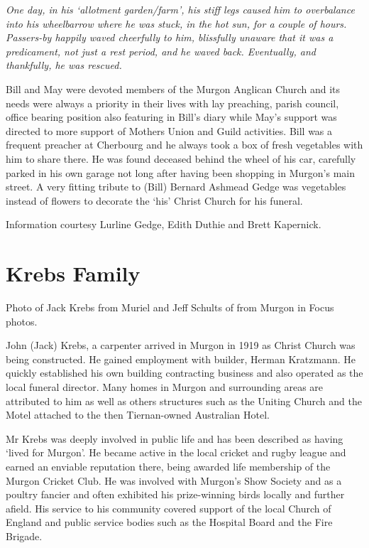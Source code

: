 \emph{One day, in his `allotment garden/farm', his stiff legs caused him to overbalance into his wheelbarrow where he was stuck, in the hot sun, for a couple of hours. Passers-by happily waved cheerfully to him, blissfully unaware that it was a predicament, not just a rest period, and he waved back. Eventually, and thankfully, he was rescued.}

Bill and May were devoted members of the Murgon Anglican Church and its needs were always a priority in their lives with lay preaching, parish council, office bearing position also featuring in Bill's diary while May's support was directed to more support of Mothers Union and Guild activities. Bill was a frequent preacher at Cherbourg and he always took a box of fresh vegetables with him to share there. He was found deceased behind the wheel of his car, carefully parked in his own garage not long after having been shopping in Murgon's main street. A very fitting tribute to (Bill) Bernard Ashmead Gedge was vegetables instead of flowers to decorate the `his' Christ Church for his funeral.

Information courtesy Lurline Gedge, Edith Duthie and Brett Kapernick.

\hypertarget{krebs-family}{%
\section{Krebs Family}\label{krebs-family}}

Photo of Jack Krebs from Muriel and Jeff Schults of from Murgon in Focus photos.

John (Jack) Krebs, a carpenter arrived in Murgon in 1919 as Christ Church was being constructed. He gained employment with builder, Herman Kratzmann. He quickly established his own building contracting business and also operated as the local funeral director. Many homes in Murgon and surrounding areas are attributed to him as well as others structures such as the Uniting Church and the Motel attached to the then Tiernan-owned Australian Hotel.

Mr Krebs was deeply involved in public life and has been described as having `lived for Murgon'. He became active in the local cricket and rugby league and earned an enviable reputation there, being awarded life membership of the Murgon Cricket Club. He was involved with Murgon's Show Society and as a poultry fancier and often exhibited his prize-winning birds locally and further afield. His service to his community covered support of the local Church of England and public service bodies such as the Hospital Board and the Fire Brigade.

